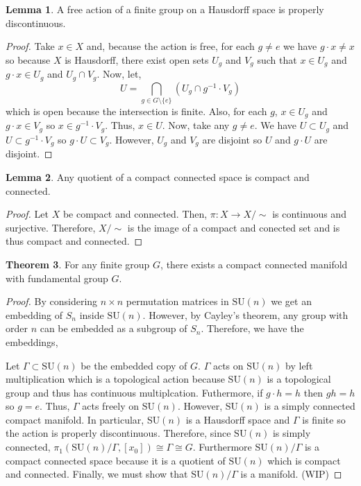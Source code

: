 \documentclass[12pt]{article}
\newcommand{\SU}[1]{\mathrm{SU}(#1)}
\theoremstyle{remark}
\theoremstyle{definition}
\newtheorem{theorem}{Theorem}[section]
\newtheorem{lemma}[theorem]{Lemma}
\begin{document}
\begin{lemma}
A free action of a finite group on a Hausdorff space is properly discontinuous.  
\end{lemma}

\begin{proof}
Take $x \in X$ and, because the action is free, for each $g \neq e$ we have $g \cdot x \neq x$ so because $X$ is Hausdorff, there exist open sets $U_g$ and $V_g$ such that $x \in U_g$ and $g \cdot x \in U_g$ and $U_g \cap V_g$. Now, let,
\[U = \bigcap_{g \in G \setminus \{e\}} (U_g \cap g^{-1} \cdot V_g)\]
which is open because the intersection is finite. Also, for each $g$, $x \in U_g$ and $g \cdot x \in V_g$ so $x \in g^{-1} \cdot V_g$. Thus, $x \in U$. Now, take any $g \neq e$. We have $U \subset U_g$ and $U \subset g^{-1} \cdot V_g$ so $g \cdot U \subset V_g$. However, $U_g$ and $V_g$ are disjoint so $U$ and $g \cdot U$ are disjoint.  
\end{proof}


\begin{lemma}
Any quotient of a compact connected space is compact and connected.
\end{lemma}

\begin{proof}
Let $X$ be compact and connected. Then, $\pi : X \to X / \sim$ is continuous and surjective. Therefore, $X / \sim$ is the image of a compact and conected set and is thus compact and connected.
\end{proof}


\begin{theorem}
For any finite group $G$, there exists a compact connected manifold with fundamental group $G$.  
\end{theorem}

\begin{proof}
By considering $n \times n$ permutation matrices in $\SU{n}$ we get an embedding of $S_n$ inside $\SU{n}$. However, by Cayley's theorem, any group with order $n$ can be embedded as a subgroup of $S_n$. Therefore, we have the embeddings,
\begin{center}
\end{center}
Let $\Gamma \subset \SU{n}$ be the embedded copy of $G$. $\Gamma$ acts on $\SU{n}$ by left multiplication which is a topological action because $\SU{n}$ is a topological group and thus has continuous multiplcation. Futhermore, if $g \cdot h = h$ then $gh = h$ so $g = e$. Thus, $\Gamma$ acts freely on $\SU{n}$. However, $\SU{n}$ is a simply connected compact manifold. In particular, $\SU{n}$ is a Hausdorff space and $\Gamma$ is finite so the action is properly discontinuous. Therefore, since $\SU{n}$ is simply connected, $\pi_1(\SU{n}/\Gamma, [x_0]) \cong \Gamma \cong G$. Furthermore $\SU{n}/\Gamma$ is a compact connected space because it is a quotient of $\SU{n}$ which is compact and connected. Finally, we must show that $\SU{n}/\Gamma$ is a manifold. (WIP)    
\end{proof}
\end{document}
